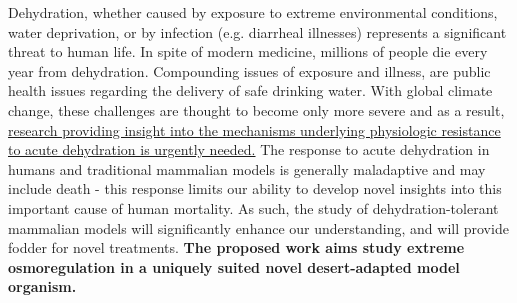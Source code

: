 \documentclass[11pt]{article}
\begin{document}
Dehydration, whether caused by exposure to extreme environmental conditions, water deprivation, or by infection (e.g. diarrheal illnesses) represents a significant threat to human life. In spite of modern medicine, millions of people die every year from dehydration. Compounding issues of exposure and illness, are public health issues regarding the delivery of safe drinking water. With global climate change, these challenges are thought to become only more severe and as a result, \ul{research providing insight into the mechanisms underlying physiologic resistance to acute dehydration is urgently needed.} The response to acute dehydration in humans and traditional mammalian models is generally maladaptive and may include death - this response limits our ability to develop novel insights into this important cause of human mortality. As such, the study of dehydration-tolerant mammalian models will significantly enhance our understanding, and will provide fodder for novel treatments. \textbf{The proposed work aims study extreme osmoregulation in a uniquely suited novel desert-adapted model organism.}
\end{document}
